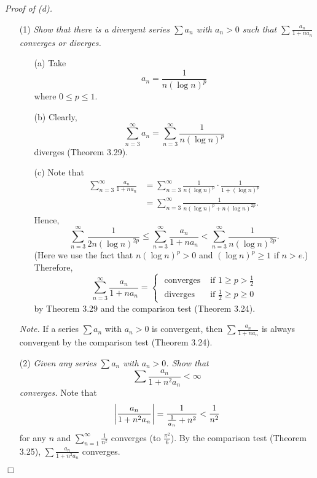 \documentclass{article}
\begin{document}
\emph{Proof of (d).}
\begin{enumerate}
  \item[(1)]
  \emph{Show that there is a divergent series $\sum a_n$ with $a_n > 0$
  such that $\sum \frac{a_n}{1+na_n}$ converges or diverges.}
    \begin{enumerate}
      \item[(a)]
      Take $$a_n = \frac{1}{n(\log n)^p}$$
      where $0 \leq p \leq 1$.
      \item[(b)]
      Clearly,
      $$\sum_{n=3}^{\infty} a_n = \sum_{n=3}^{\infty} \frac{1}{n(\log n)^p}$$
      diverges (Theorem 3.29).
      \item[(c)]
      Note that
      \begin{align*}
        \sum_{n=3}^{\infty} \frac{a_n}{1+na_n}
        &= \sum_{n=3}^{\infty} \frac{1}{n(\log n)^p} \cdot \frac{1}{1 + (\log n)^p} \\
        &= \sum_{n=3}^{\infty} \frac{1}{n(\log n)^p + n(\log n)^{2p}}.
      \end{align*}
      Hence,
      $$ \sum_{n=3}^{\infty} \frac{1}{2n(\log n)^{2p}}
      \leq \sum_{n=3}^{\infty} \frac{a_n}{1+na_n}
      < \sum_{n=3}^{\infty} \frac{1}{n(\log n)^{2p}}.$$
      (Here we use the fact that $n(\log n)^p > 0$ and $(\log n)^p \geq 1$ if $n > e$.)
      Therefore,
      \begin{equation*}
        \sum_{n=3}^{\infty} \frac{a_n}{1+na_n} =
        \begin{cases}
          \text{ converges } & \text{if $1 \geq p > \frac{1}{2}$} \\
          \text{ diverges }  & \text{if $\frac{1}{2} \geq p \geq 0$}
        \end{cases}
      \end{equation*}
      by Theorem 3.29 and the comparison test (Theorem 3.24).
    \end{enumerate}
    \emph{Note.} If a series $\sum a_n$ with $a_n > 0$ is convergent,
    then $\sum \frac{a_n}{1+na_n}$ is always convergent
    by the comparison test (Theorem 3.24).
  \item[(2)]
  \emph{Given any series $\sum a_n$ with $a_n > 0$.
  Show that $$\sum \frac{a_n}{1+n^2a_n} < \infty$$
  converges.}
  Note that
  $$\abs{ \frac{a_n}{1+n^2a_n} }
  = \frac{1}{\frac{1}{a_n}+n^2}
  < \frac{1}{n^2}$$
  for any $n$ and $\sum_{n=1}^{\infty} \frac{1}{n^2}$ converges (to $\frac{\pi^2}{6}$).
  By the comparison test (Theorem 3.25),
  $\sum \frac{a_n}{1+n^2a_n}$ converges.
\end{enumerate}
$\Box$ \\
\end{document}
